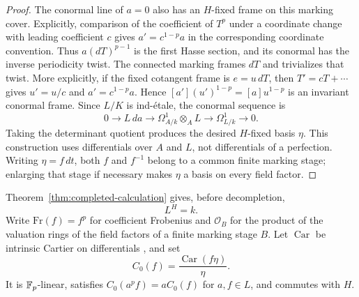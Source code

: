 \begin{proof}
The conormal line of $a=0$ also has an $H$-fixed frame on this marking
cover.  Explicitly, comparison of the coefficient of $T^p$ under a
coordinate change with leading coefficient $c$ gives
$a'=c^{1-p}a$ in the corresponding coordinate convention.  Thus
$a(dT)^{p-1}$ is the first Hasse section, and its conormal has the
inverse periodicity twist.  The connected marking frames $dT$ and
trivializes that twist.  More explicitly, if the fixed cotangent
frame is $e=u\,dT$, then $T'=cT+\cdots$ gives $u'=u/c$ and
$a'=c^{1-p}a$.  Hence $[a'](u')^{1-p}=[a]u^{1-p}$ is an
invariant conormal frame.  Since $L/K$ is ind-\'{e}tale, the conormal
sequence is
\[
 0\longrightarrow L\,da
 \longrightarrow\Omega^1_{A/k}\otimes_A L
 \longrightarrow\Omega^1_{L/k}\longrightarrow0.
\]
Taking the determinant quotient produces the desired $H$-fixed
basis $\eta$.  This construction uses differentials over $A$ and
$L$, not differentials of a perfection.  Writing $\eta=f\,dt$, both
$f$ and $f^{-1}$ belong to a common finite marking stage; enlarging
that stage if necessary makes $\eta$ a basis on every field factor.
\end{proof}

Theorem~\ref{thm:completed-calculation} gives, before decompletion,
\begin{equation}
 \label{eq:L-H-invariants}
 L^H=k.
\end{equation}
Write $\mathrm{Fr}(f)=f^p$ for coefficient Frobenius and
$\mathcal O_B$ for the product of the valuation rings of the field
factors of a finite marking stage $B$.
Let $\operatorname{Car}$ be intrinsic Cartier on differentials
\citep[Chapter~II, Section~6]{Cartier58}, and set
\begin{equation}
 \label{eq:normalized-Cartier}
 C_0(f)=\frac{\operatorname{Car}(f\eta)}{\eta}.
\end{equation}
It is $\mathbb F_p$-linear, satisfies $C_0(a^pf)=aC_0(f)$ for $a,f\in L$,
and commutes with $H$.

